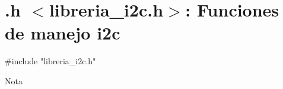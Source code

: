\hypertarget{group__libreria__i2c}{
\section{.h $<$libreria\_\-i2c.h$>$: Funciones de manejo i2c}
\label{group__libreria__i2c}
}

\begin{DoxyCode}
    #include "libreria_i2c.h"
\end{DoxyCode}


\begin{DoxyNote}{Nota}

\end{DoxyNote}
